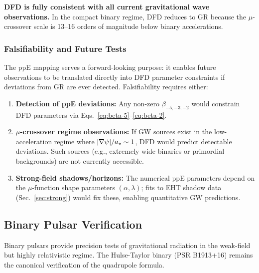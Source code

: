 \begin{tcolorbox}[colback=green!5!white, colframe=green!50!black, title=Key Result: GW Consistency]
\textbf{DFD is fully consistent with all current gravitational wave observations.} In the compact binary regime, DFD reduces to GR because the $\mu$-crossover scale is 13--16 orders of magnitude below binary accelerations.
\end{tcolorbox}

\subsubsection{Falsifiability and Future Tests}\label{sec:gw-falsify}

The ppE mapping serves a forward-looking purpose: it enables future observations to be translated directly into DFD parameter constraints if deviations from GR are ever detected. Falsifiability requires either:

\begin{enumerate}
\item \textbf{Detection of ppE deviations:} Any non-zero $\beta_{-5,-3,-2}$ would constrain DFD parameters via Eqs.~\eqref{eq:beta-5}--\eqref{eq:beta-2}.

\item \textbf{$\mu$-crossover regime observations:} If GW sources exist in the low-acceleration regime where $|\nabla\psi|/a_\star \sim 1$, DFD would predict detectable deviations. Such sources (e.g., extremely wide binaries or primordial backgrounds) are not currently accessible.

\item \textbf{Strong-field shadows/horizons:} The numerical ppE parameters depend on the $\mu$-function shape parameters $(\alpha, \lambda)$; fits to EHT shadow data (Sec.~\ref{sec:strong}) would fix these, enabling quantitative GW predictions.
\end{enumerate}

\subsection{Binary Pulsar Verification}\label{sec:gw-pulsar}

Binary pulsars provide precision tests of gravitational radiation in the weak-field but highly relativistic regime. The Hulse-Taylor binary (PSR B1913+16) remains the canonical verification of the quadrupole formula.

